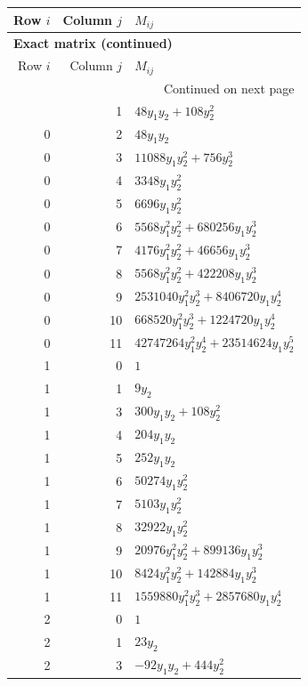 \documentclass[10pt,a4paper]{article}
\begin{document}
{\small\setlength{\tabcolsep}{7pt}\begin{longtable}{rrp{125mm}}
\toprule Row $i$ & Column $j$ & $M_{ij}$\\\midrule\endfirsthead
\multicolumn{3}{l}{\textbf{Exact matrix (continued)}}\\
\toprule Row $i$ & Column $j$ & $M_{ij}$\\\midrule\endhead
\midrule\multicolumn{3}{r}{Continued on next page}\\\endfoot\bottomrule\endlastfoot
0 & 1 & $48 y_{1} y_{2} + 108 y_{2}^{2}$\\
0 & 2 & $48 y_{1} y_{2}$\\
0 & 3 & $11088 y_{1} y_{2}^{2} + 756 y_{2}^{3}$\\
0 & 4 & $3348 y_{1} y_{2}^{2}$\\
0 & 5 & $6696 y_{1} y_{2}^{2}$\\
0 & 6 & $5568 y_{1}^{2} y_{2}^{2} + 680256 y_{1} y_{2}^{3}$\\
0 & 7 & $4176 y_{1}^{2} y_{2}^{2} + 46656 y_{1} y_{2}^{3}$\\
0 & 8 & $5568 y_{1}^{2} y_{2}^{2} + 422208 y_{1} y_{2}^{3}$\\
0 & 9 & $2531040 y_{1}^{2} y_{2}^{3} + 8406720 y_{1} y_{2}^{4}$\\
0 & 10 & $668520 y_{1}^{2} y_{2}^{3} + 1224720 y_{1} y_{2}^{4}$\\
0 & 11 & $42747264 y_{1}^{2} y_{2}^{4} + 23514624 y_{1} y_{2}^{5}$\\
1 & 0 & $1$\\
1 & 1 & $9 y_{2}$\\
1 & 3 & $300 y_{1} y_{2} + 108 y_{2}^{2}$\\
1 & 4 & $204 y_{1} y_{2}$\\
1 & 5 & $252 y_{1} y_{2}$\\
1 & 6 & $50274 y_{1} y_{2}^{2}$\\
1 & 7 & $5103 y_{1} y_{2}^{2}$\\
1 & 8 & $32922 y_{1} y_{2}^{2}$\\
1 & 9 & $20976 y_{1}^{2} y_{2}^{2} + 899136 y_{1} y_{2}^{3}$\\
1 & 10 & $8424 y_{1}^{2} y_{2}^{2} + 142884 y_{1} y_{2}^{3}$\\
1 & 11 & $1559880 y_{1}^{2} y_{2}^{3} + 2857680 y_{1} y_{2}^{4}$\\
2 & 0 & $1$\\
2 & 1 & $23 y_{2}$\\
2 & 3 & $- 92 y_{1} y_{2} + 444 y_{2}^{2}$\\

\end{longtable}}
\end{document}

